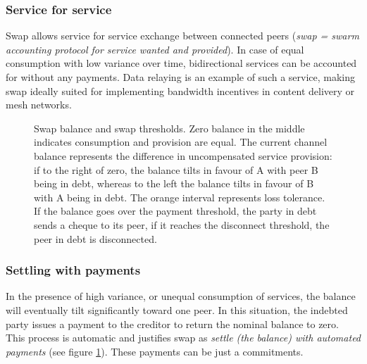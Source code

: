 \subsubsection{Service for service}

Swap allows service for service exchange between connected peers (\emph{swap = swarm accounting protocol for service wanted and provided}). In case of equal consumption with low variance over time, bidirectional services can be accounted for without any payments. Data relaying is an example of such a service, making swap ideally suited for implementing bandwidth incentives in content delivery or mesh networks.

\begin{center}
\begin{figure}[htbp]

\caption{Swap balance and swap thresholds.
Zero balance in the middle indicates consumption and provision are equal.
The current channel balance represents the difference in uncompensated service provision:
if to the right of zero, the balance tilts in favour of A with peer B being in debt, whereas to the left
the balance tilts in favour of B with A being in debt.
The orange interval represents loss tolerance. If the balance goes over the payment threshold, the party in
debt sends a cheque to its peer, if it reaches the disconnect threshold, the peer in debt is disconnected.}
\label{fig:swap}
\end{figure}
\end{center}

\subsubsection{Settling with payments}

In the presence of high variance, or unequal consumption of services, the balance will eventually tilt significantly toward one peer. In this situation, the indebted party issues a payment to the creditor to return the nominal balance to zero. This process is automatic and justifies swap as \emph{settle (the balance) with automated payments} (see figure \ref{fig:swap}). These payments can be just a commitments.

